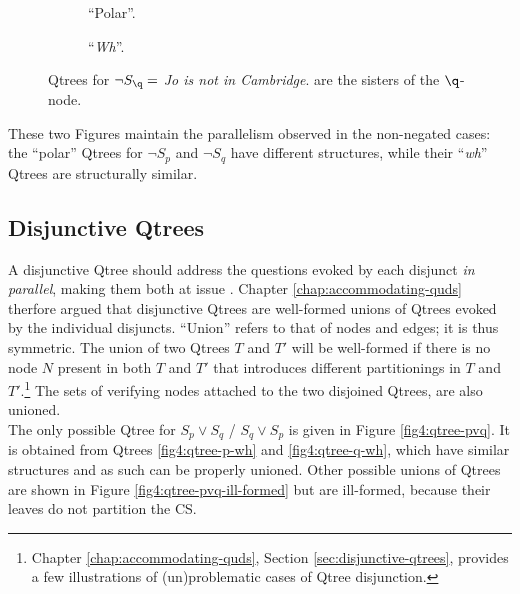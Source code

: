	\setlength{\fboxsep}{2pt}
	\begin{figure}[H]
		\centering
		\begin{subfigure}[b]{.45\linewidth}
			\centering
			\caption[]{``Polar''.}\label{fig4:qtree-nq-polar}
		\end{subfigure}\hfill
		\begin{subfigure}[b]{.45\linewidth}
			\centering
			\scalebox{1}{
				\begin{forest}
					[CS [\fbox{$\p$}][{$\q$}][\fbox{$\r$}][\fbox{...}]]
				\end{forest}
			}
			\caption[]{``\textit{Wh}''.}\label{fig4:qtree-nq-wh}
		\end{subfigure}
		\caption[]{Qtrees for $\neg S\protect_\q=$ \textit{Jo is not in Cambridge}.  are the sisters of the $\q$-node.}
		\label{fig4:qtrees-nq}
	\end{figure}

These two Figures maintain the parallelism observed in the non-negated cases: the ``polar'' Qtrees for $\neg S_p$ and $\neg S_q$ have different structures, while their ``\textit{wh}'' Qtrees are structurally similar.

\subsection{Disjunctive Qtrees}\label{sec:disj-lfs}

A disjunctive Qtree should address the questions evoked by each disjunct \textit{in parallel}, making them both at issue \citep{Simons2001,Zhang2022}. Chapter \ref{chap:accommodating-quds} therfore argued that disjunctive Qtrees are well-formed unions of Qtrees evoked by the individual disjuncts. ``Union'' refers to that of nodes and edges; it is thus symmetric. The union of two Qtrees $T$ and $T'$ will be well-formed if there is no node $N$ present in both $T$ and $T'$ that introduces different partitionings in $T$ and $T'$.\footnote{Chapter \ref{chap:accommodating-quds}, Section \ref{sec:disjunctive-qtrees}, provides a few illustrations of (un)problematic cases of Qtree disjunction.} The sets of verifying nodes attached to the two disjoined Qtrees, are also unioned. \\

The only possible Qtree for $S_p \vee S_q$ / $S_q \vee S_p$ is given in Figure \ref{fig4:qtree-pvq}. It is obtained from Qtrees \ref{fig4:qtree-p-wh} and \ref{fig4:qtree-q-wh}, which have similar structures and as such can be properly unioned. Other possible unions of Qtrees are shown in Figure \ref{fig4:qtree-pvq-ill-formed} but are ill-formed, because their leaves do not partition the CS. 


